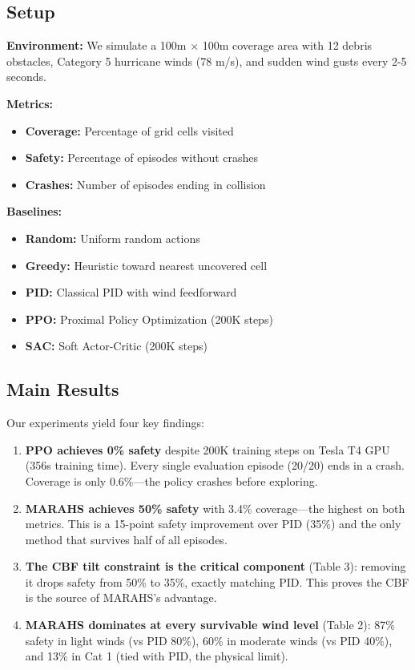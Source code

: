 \documentclass[10pt,twocolumn]{article}
\begin{document}
\subsection{Setup}

\textbf{Environment:} We simulate a 100m $\times$ 100m coverage area with 12 debris obstacles, Category 5 hurricane winds (78 m/s), and sudden wind gusts every 2-5 seconds.

\textbf{Metrics:}
\begin{itemize}
    \item \textbf{Coverage:} Percentage of grid cells visited
    \item \textbf{Safety:} Percentage of episodes without crashes
    \item \textbf{Crashes:} Number of episodes ending in collision
\end{itemize}

\textbf{Baselines:}
\begin{itemize}
    \item \textbf{Random:} Uniform random actions
    \item \textbf{Greedy:} Heuristic toward nearest uncovered cell
    \item \textbf{PID:} Classical PID with wind feedforward
    \item \textbf{PPO:} Proximal Policy Optimization (200K steps)
    \item \textbf{SAC:} Soft Actor-Critic (200K steps)
\end{itemize}

\subsection{Main Results}



Our experiments yield four key findings:
\begin{enumerate}
    \item \textbf{PPO achieves 0\% safety} despite 200K training steps on Tesla T4 GPU (356s training time). Every single evaluation episode (20/20) ends in a crash. Coverage is only 0.6\%---the policy crashes before exploring.
    \item \textbf{MARAHS achieves 50\% safety} with 3.4\% coverage---the highest on both metrics. This is a 15-point safety improvement over PID (35\%) and the only method that survives half of all episodes.
    \item \textbf{The CBF tilt constraint is the critical component} (Table 3): removing it drops safety from 50\% to 35\%, exactly matching PID. This proves the CBF is the source of MARAHS's advantage.
    \item \textbf{MARAHS dominates at every survivable wind level} (Table 2): 87\% safety in light winds (vs PID 80\%), 60\% in moderate winds (vs PID 40\%), and 13\% in Cat 1 (tied with PID, the physical limit).
\end{enumerate}
\end{document}

